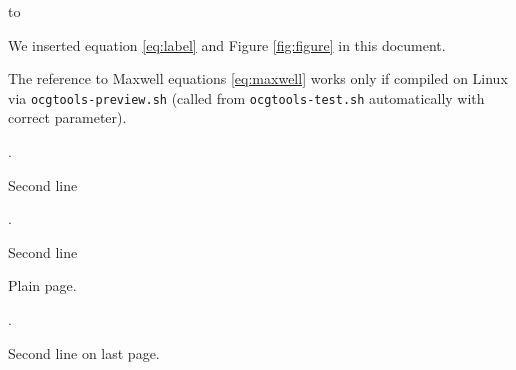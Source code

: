 \hbox to 

\ifx \MyPersonalMacro \undefined \else
We inserted equation \eqref{eq:label} and Figure \ref{fig:figure} in
this document.

The reference to Maxwell equations \eqref{eq:maxwell} works only if
compiled on Linux via \texttt{ocgtools-preview.sh} (called from
\texttt{ocgtools-test.sh} automatically with correct parameter). \fi

\label{page}
\newpage

 .

Second line

\bigskip

 .

Second line
\newpage

Plain page.
\newpage

 .

Second line on last page.
